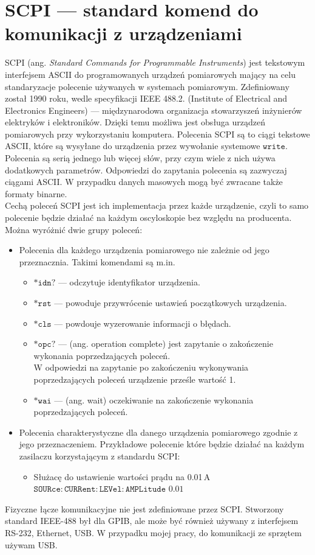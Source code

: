 \section{SCPI --- standard komend do komunikacji z urządzeniami}
SCPI  (ang. \textit{Standard  Commands  for  Programmable  Instruments}) jest tekstowym interfejsem ASCII do programowanych
urządzeń pomiarowych mający na celu standaryzacje polecenie używanych w systemach pomiarowym. Zdefiniowany został 1990 roku,
wedle specyfikacji IEEE 488.2. (Institute of Electrical and Electronics Engineers) --- międzynarodowa organizacja stowarzyszeń
inżynierów elektryków i elektroników.  Dzięki temu możliwa jest obsługa urządzeń pomiarowych przy wykorzystaniu komputera.
Polecenia SCPI są to ciągi tekstowe ASCII, które są wysyłane do urządzenia przez wywołanie systemowe $\mathtt{write}$.
Polecenia są serią jednego lub więcej słów, przy czym wiele z nich używa dodatkowych parametrów.
 Odpowiedzi do zapytania polecenia są zazwyczaj ciągami ASCII.
  W przypadku danych masowych mogą być zwracane także formaty binarne. \\

Cechą poleceń  SCPI jest ich implementacja przez każde urządzenie, czyli to samo polecenie będzie działać na każdym oscyloskopie
 bez względu na producenta. Można wyróżnić dwie grupy poleceń:
\begin{itemize}
\item Polecenia dla każdego urządzenia pomiarowego nie zależnie od jego przeznacznia. Takimi komendami są m.in.
\begin{itemize}
\item $\mathtt{*idn?}$ --- odczytuje identyfikator urządzenia.
\item $\mathtt{*rst}$ --- powoduje przywrócenie ustawień początkowych urządzenia.
\item $\mathtt{*cls}$ --- powdouje wyzerowanie informacji o błędach.
\item $\mathtt{*opc?}$  --- (ang.  operation  complete) jest zapytanie o zakończenie wykonania
poprzedzających poleceń. \\
W  odpowiedzi  na  zapytanie  po  zakończeniu  wykonywania  poprzedzających poleceń urządzenie prześle wartość 1.
\item $\mathtt{*wai}$ ---  (ang.  wait)  oczekiwanie  na  zakończenie  wykonania  poprzedzających poleceń.
\end{itemize}

\item Polecenia charakterystyczne dla danego urządzenia pomiarowego zgodnie z jego przeznaczeniem.
Przykładowe polecenie które będzie działać na każdym zasilaczu korzystającym z standardu SCPI:
\begin{itemize}
\item Służacę do ustawienie wartości prądu na 0.01\,A \\ $\mathtt{SOURce:CURRent:LEVel:AMPLitude}$  $\mathtt{0.01}$
\end{itemize}
\end{itemize}

Fizyczne łącze komunikacyjne nie jest zdefiniowane przez SCPI. Stworzony standard IEEE-488 był dla GPIB,
ale może być również używany z interfejsem RS-232, Ethernet, USB. W przypadku mojej pracy, do komunikacji ze sprzętem
 używam USB.
\newpage